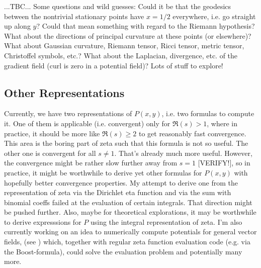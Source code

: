 \documentclass[12pt]{article}
\begin{document}
...TBC... Some questions and wild guesses: Could it be that the geodesics between the nontrivial stationary points have $x=1/2$ everywhere, i.e. go straight up along $y$? Could that mean something with regard to the Riemann hypothesis? What about the directions of principal curvature at these points (or elsewhere)? What about Gaussian curvature, Riemann tensor, Ricci tensor, metric tensor, Christoffel symbols, etc.? What about the Laplacian, divergence, etc. of the gradient field (curl is zero in a potential field)? Lots of stuff to explore!

\subsection{Other Representations}
Currently, we have two representations of $P(x,y)$, i.e. two formulas to compute it. One of them is applicable (i.e. convergent) only for $\Re(s) > 1$, where in practice, it should be more like $\Re(s) \geq 2$ to get reasonably fast convergence. This area is the boring part of zeta such that this formula is not so useful. The other one is convergent for all $s \neq 1$. That's already much more useful. However, the convergence might be rather slow further away from $s=1$ [VERIFY!], so in practice, it might be worthwhile to derive yet other formulas for $P(x,y)$ with hopefully better convergence properties. My attempt to derive one from the representation of zeta via the Dirichlet eta function and via the sum with binomial coeffs failed at the evaluation of certain integrals. That direction might be pushed further. Also, maybe for theoretical explorations, it may be worthwhile to derive expresssions for $P$ using the integral representation of zeta. I'm also currently working on an idea to numerically compute potentials for general vector fields, (see \cite{PotentialNumerical}) which, together with regular zeta function evaluation code (e.g. via the Boost-formula), could solve the evaluation problem and potentially many more.








\end{document}
